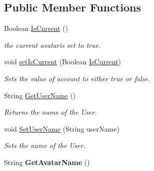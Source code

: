 \subsection*{Public Member Functions}
\begin{DoxyCompactItemize}
\item 
Boolean \hyperlink{classcom_1_1shephertz_1_1app42_1_1paas_1_1sdk_1_1windows_1_1avatar_1_1_avatar_a3cddc1664b8ebef8a270f3843fe9866b}{Is\+Current} ()
\begin{DoxyCompactList}\small\item\em the current avataris set to true. \end{DoxyCompactList}\item 
void \hyperlink{classcom_1_1shephertz_1_1app42_1_1paas_1_1sdk_1_1windows_1_1avatar_1_1_avatar_a91f08a3f4df71bee162f16cd9e7aa609}{set\+Is\+Current} (Boolean \hyperlink{classcom_1_1shephertz_1_1app42_1_1paas_1_1sdk_1_1windows_1_1avatar_1_1_avatar_a3cddc1664b8ebef8a270f3843fe9866b}{Is\+Current})
\begin{DoxyCompactList}\small\item\em Sets the value of account to either true or false. \end{DoxyCompactList}\item 
String \hyperlink{classcom_1_1shephertz_1_1app42_1_1paas_1_1sdk_1_1windows_1_1avatar_1_1_avatar_a4025bc6d5c3e36771d6a9a9a8cf1ecd2}{Get\+User\+Name} ()
\begin{DoxyCompactList}\small\item\em Returns the name of the User. \end{DoxyCompactList}\item 
void \hyperlink{classcom_1_1shephertz_1_1app42_1_1paas_1_1sdk_1_1windows_1_1avatar_1_1_avatar_a5d2a8862811d485ba177387600834227}{Set\+User\+Name} (String user\+Name)
\begin{DoxyCompactList}\small\item\em Sets the name of the User. \end{DoxyCompactList}\item 
\hypertarget{classcom_1_1shephertz_1_1app42_1_1paas_1_1sdk_1_1windows_1_1avatar_1_1_avatar_a44e2e645168f6f85c18d80fd223a2021}{String {\bfseries Get\+Avatar\+Name} ()}\label{classcom_1_1shephertz_1_1app42_1_1paas_1_1sdk_1_1windows_1_1avatar_1_1_avatar_a44e2e645168f6f85c18d80fd223a2021}


\end{DoxyCompactItemize}
